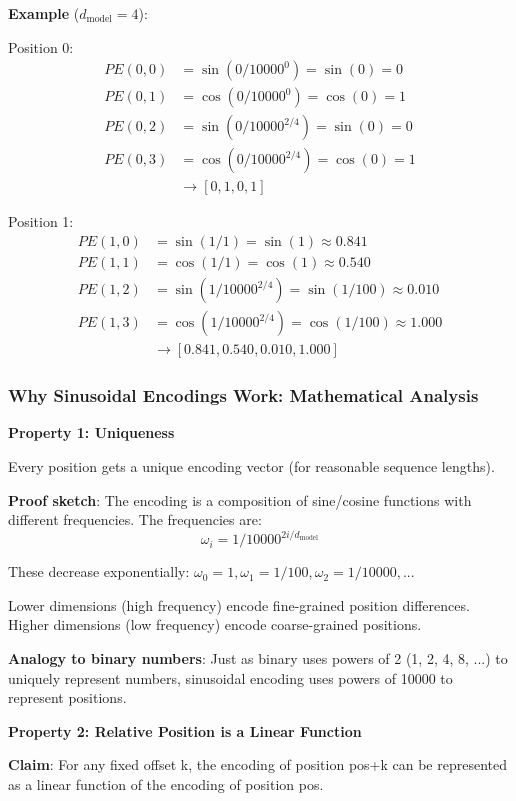 \textbf{Example} ($d_{\text{model}} = 4$):

Position 0:
\begin{align*}
PE(0, 0) &= \sin(0/10000^0) = \sin(0) = 0 \\
PE(0, 1) &= \cos(0/10000^0) = \cos(0) = 1 \\
PE(0, 2) &= \sin(0/10000^{2/4}) = \sin(0) = 0 \\
PE(0, 3) &= \cos(0/10000^{2/4}) = \cos(0) = 1 \\
&\to [0, 1, 0, 1]
\end{align*}

Position 1:
\begin{align*}
PE(1, 0) &= \sin(1/1) = \sin(1) \approx 0.841 \\
PE(1, 1) &= \cos(1/1) = \cos(1) \approx 0.540 \\
PE(1, 2) &= \sin(1/10000^{2/4}) = \sin(1/100) \approx 0.010 \\
PE(1, 3) &= \cos(1/10000^{2/4}) = \cos(1/100) \approx 1.000 \\
&\to [0.841, 0.540, 0.010, 1.000]
\end{align*}

\subsubsection{Why Sinusoidal Encodings Work: Mathematical Analysis}

\textbf{Property 1: Uniqueness}

Every position gets a unique encoding vector (for reasonable sequence lengths).

\textbf{Proof sketch}: The encoding is a composition of sine/cosine functions with different frequencies. The frequencies are:
\[
\omega_i = 1 / 10000^{2i/d_{\text{model}}}
\]

These decrease exponentially: $\omega_0 = 1, \omega_1 = 1/100, \omega_2 = 1/10000, ...$

Lower dimensions (high frequency) encode fine-grained position differences. Higher dimensions (low frequency) encode coarse-grained positions.

\textbf{Analogy to binary numbers}: Just as binary uses powers of 2 (1, 2, 4, 8, ...) to uniquely represent numbers, sinusoidal encoding uses powers of 10000 to represent positions.

\textbf{Property 2: Relative Position is a Linear Function}

\textbf{Claim}: For any fixed offset k, the encoding of position pos+k can be represented as a linear function of the encoding of position pos.

